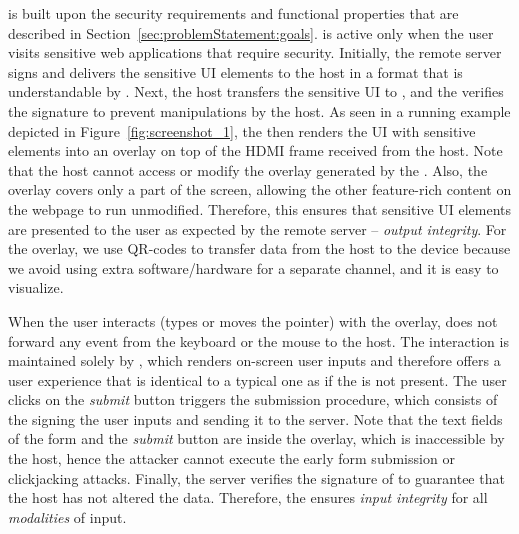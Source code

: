 \name is built upon the security requirements and functional properties that are described in Section~\ref{sec:problemStatement:goals}. %
\device is active only when the user visits sensitive web applications that require \name security.
Initially, the remote server signs and delivers the sensitive UI elements to the host in a format that is understandable by \device. Next, the host transfers the sensitive UI to \device, and the \device verifies the signature to prevent manipulations by the host. As seen in a running example depicted in Figure~\ref{fig:screenshot_1}, the \device then renders the UI with sensitive elements into an overlay on top of the HDMI frame received from the host. Note that the host cannot access or modify the overlay generated by the \device. Also, the overlay covers only a part of the screen, allowing the other feature-rich content on the webpage to run unmodified. Therefore, this ensures that sensitive UI elements are presented to the user as expected by the remote server -- \emph{output integrity}. For the overlay, we use QR-codes to transfer data from the host to the device because we avoid using extra software/hardware for a separate channel, and it is easy to visualize.

When the user interacts (types or moves the pointer) with the overlay, \device does not forward any event from the keyboard or the mouse to the host. The interaction is maintained solely by \device, which renders on-screen user inputs and therefore offers a user experience that is identical to a typical one as if the \device is not present. The user clicks on the \emph{submit} button triggers the submission procedure, which consists of the \device signing the user inputs and sending it to the server. Note that the text fields of the form and the \emph{submit} button are inside the overlay, which is inaccessible by the host, hence the attacker cannot execute the early form submission or clickjacking attacks. Finally, the server verifies the signature of \device to guarantee that the host has not altered the data. Therefore, the \device ensures \emph{input integrity} for all \emph{modalities} of input.

